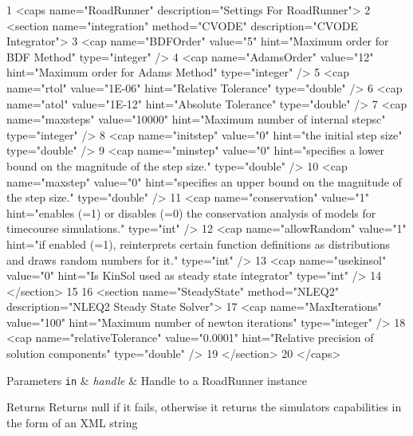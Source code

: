 \begin{DoxyCode}
1  <caps name="RoadRunner" description="Settings For RoadRunner">
2   <section name="integration" method="CVODE" description="CVODE Integrator">
3     <cap name="BDFOrder" value="5" hint="Maximum order for BDF Method" type="integer" />
4     <cap name="AdamsOrder" value="12" hint="Maximum order for Adams Method" type="integer" />
5     <cap name="rtol" value="1E-06" hint="Relative Tolerance" type="double" />
6     <cap name="atol" value="1E-12" hint="Absolute Tolerance" type="double" />
7     <cap name="maxsteps" value="10000" hint="Maximum number of internal stepsc" type="integer" />
8     <cap name="initstep" value="0" hint="the initial step size" type="double" />
9     <cap name="minstep" value="0" hint="specifies a lower bound on the magnitude of the step size."
       type="double" />
10     <cap name="maxstep" value="0" hint="specifies an upper bound on the magnitude of the step size."
       type="double" />
11     <cap name="conservation" value="1" hint="enables (=1) or disables (=0) the conservation analysis of
       models for timecourse simulations." type="int" />
12     <cap name="allowRandom" value="1" hint="if enabled (=1), reinterprets certain function definitions as
       distributions and draws random numbers for it." type="int" />
13     <cap name="usekinsol" value="0" hint="Is KinSol used as steady state integrator" type="int" />
14   </section>
15 
16   <section name="SteadyState" method="NLEQ2" description="NLEQ2 Steady State Solver">
17     <cap name="MaxIterations" value="100" hint="Maximum number of newton iterations" type="integer" />
18     <cap name="relativeTolerance" value="0.0001" hint="Relative precision of solution components"
       type="double" />
19   </section>
20 </caps>
\end{DoxyCode}



\begin{DoxyParams}[1]{Parameters}
\mbox{\tt in}  & {\em handle} & Handle to a Road\+Runner instance \\
\hline
\end{DoxyParams}
\begin{DoxyReturn}{Returns}
Returns null if it fails, otherwise it returns the simulator\textquotesingle{}s capabilities in the form of an X\+M\+L string 
\end{DoxyReturn}
\hypertarget{group__simulation_gaaa761b3be4a3348a60c7ae7083d57947}{}
